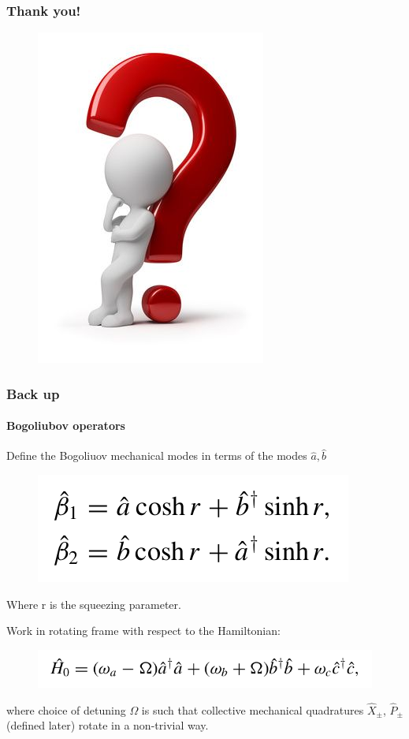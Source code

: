 \documentclass[aspectratio=43]{beamer}
\begin{document}
\begin{frame}
	
	\frametitle{Thank you!}
		
	\begin{figure}
		\includegraphics[width = 3 cm]{plots/thinking2.png}
	\end{figure}

\end{frame}

\begin{frame}

	\frametitle{Back up}
	\framesubtitle{Bogoliubov operators}
	
	Define the {\color{blue}Bogoliuov} mechanical modes in terms of the modes $\hat{a}, \hat{b}$
	\begin{figure}
		\includegraphics[width = 4.5 cm]{plots/bogoliubov_1.png}
	\end{figure}	
	
	Where r is the {\color{blue}squeezing parameter}.
	
	\vspace{0.5 cm}
	
	Work in rotating frame with respect to the Hamiltonian:
	\begin{figure}
		\includegraphics[width = 8 cm]{plots/hamiltonian_2.png}
	\end{figure}	
	
	where choice of detuning $\Omega$ is such that collective mechanical quadratures $\hat{X}_{\pm}$, $\hat{P}_{\pm}$ (defined later) rotate in a non-trivial way.

\end{frame}
\end{document}
